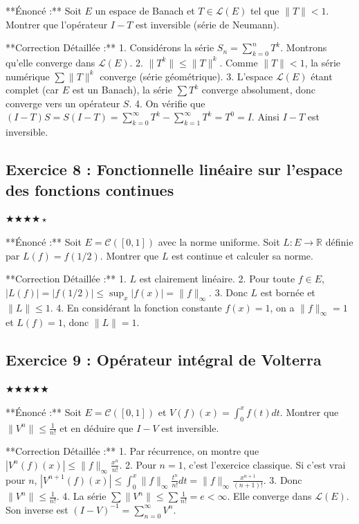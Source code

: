 \documentclass[11pt,a4paper]{article}
\begin{document}
**Énoncé :**
Soit $E$ un espace de Banach et $T \in \mathcal{L}(E)$ tel que $\|T\| < 1$. Montrer que l'opérateur $I - T$ est inversible (série de Neumann).

**Correction Détaillée :**
1. Considérons la série $S_n = \sum_{k=0}^n T^k$. Montrons qu'elle converge dans $\mathcal{L}(E)$.
2. $\|T^k\| \le \|T\|^k$. Comme $\|T\| < 1$, la série numérique $\sum \|T\|^k$ converge (série géométrique).
3. L'espace $\mathcal{L}(E)$ étant complet (car $E$ est un Banach), la série $\sum T^k$ converge absolument, donc converge vers un opérateur $S$.
4. On vérifie que $(I-T)S = S(I-T) = \sum_{k=0}^\infty T^k - \sum_{k=1}^\infty T^k = T^0 = I$. Ainsi $I-T$ est inversible.


\subsection*{Exercice 8 : Fonctionnelle linéaire sur l'espace des fonctions continues}
$\bigstar\bigstar\bigstar\bigstar\star$

**Énoncé :**
Soit $E = \mathcal{C}([0,1])$ avec la norme uniforme. Soit $L: E \to \mathbb{R}$ définie par $L(f) = f(1/2)$. Montrer que $L$ est continue et calculer sa norme.

**Correction Détaillée :**
1. $L$ est clairement linéaire.
2. Pour toute $f \in E$, $|L(f)| = |f(1/2)| \le \sup_{x} |f(x)| = \|f\|_\infty$.
3. Donc $L$ est bornée et $\|L\| \le 1$.
4. En considérant la fonction constante $f(x) = 1$, on a $\|f\|_\infty = 1$ et $L(f) = 1$, donc $\|L\| = 1$.


\subsection*{Exercice 9 : Opérateur intégral de Volterra}
$\bigstar\bigstar\bigstar\bigstar\bigstar$

**Énoncé :**
Soit $E = \mathcal{C}([0,1])$ et $V(f)(x) = \int_0^x f(t)dt$. Montrer que $\|V^n\| \le \frac{1}{n!}$ et en déduire que $I-V$ est inversible.

**Correction Détaillée :**
1. Par récurrence, on montre que $|V^n(f)(x)| \le \|f\|_\infty \frac{x^n}{n!}$.
2. Pour $n=1$, c'est l'exercice classique. Si c'est vrai pour $n$, $|V^{n+1}(f)(x)| \le \int_0^x \|f\|_\infty \frac{t^n}{n!} dt = \|f\|_\infty \frac{x^{n+1}}{(n+1)!}$.
3. Donc $\|V^n\| \le \frac{1}{n!}$.
4. La série $\sum \|V^n\| \le \sum \frac{1}{n!} = e < \infty$. Elle converge dans $\mathcal{L}(E)$. Son inverse est $(I-V)^{-1} = \sum_{n=0}^\infty V^n$.
\end{document}
